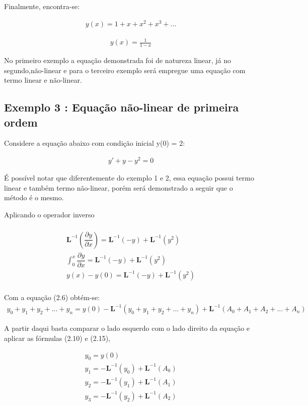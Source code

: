 Finalmente, encontra-se:

\begin{gather*}
y(x) = 1 + x+ x^2 + x^3 +...
\end{gather*}

\begin{gather*}
y(x) = \frac {1}{1-x}
\end{gather*}

No primeiro exemplo a equação demonstrada foi de natureza linear, já no segundo,não-linear e para o terceiro exemplo será empregue uma equação  com termo linear e não-linear.

\subsection{Exemplo 3 : Equação não-linear de primeira ordem}

Considere a equação abaixo com condição inicial y(0) = 2:

\begin{gather*}
y' + y - y^2 = 0
\end{gather*}

É possível notar que diferentemente do exemplo 1 e 2, essa equação possui termo linear e também termo não-linear, porém será demonstrado a seguir que o método é o mesmo.

Aplicando o operador inverso

\begin{gather*}\nonumber\\
 \textbf{L}^{-1}\left(\dfrac{\partial y}{\partial x}\right) = \textbf{L}^{-1}(-y) + \textbf{L}^{-1}(y^2)\nonumber\\
 \int_0^{x}\dfrac{\partial y}{\partial x} = \textbf{L}^{-1} (-y) + \textbf{L}^{-1} (y^2)\nonumber\\
 y(x)-y(0) = \textbf{L}^{-1} (-y) + \textbf{L}^{-1} (y^2)\nonumber\\
 \end{gather*}

Com a equação (2.6) obtém-se:
\begin{gather*}
 y_{0} +y_{1} + y_{2} + ... + y_{n}  =  y(0) - \textbf{L}^{-1}( y_{0} +y_{1} + y_{2} + ... + y_{n} ) +\textbf{L}^{-1}( A_{0} +A_{1} + A_{2} + ... + A_{n})
 \end{gather*}

A partir daqui basta comparar o lado esquerdo com o lado direito da equação e aplicar as fórmulas (2.10) e (2.15),

\begin{gather*}
y_{0} = y(0)\nonumber\\
y_{1} = -\textbf{L}^{-1}(y_{0}) + \textbf{L}^{-1}(A_{0})\nonumber\\
y_{2} = -\textbf{L}^{-1}(y_{1}) + \textbf{L}^{-1}(A_{1})\nonumber\\
y_{3} = -\textbf{L}^{-1}(y_{2}) + \textbf{L}^{-1}(A_{2})\nonumber\\
\end{gather*}


